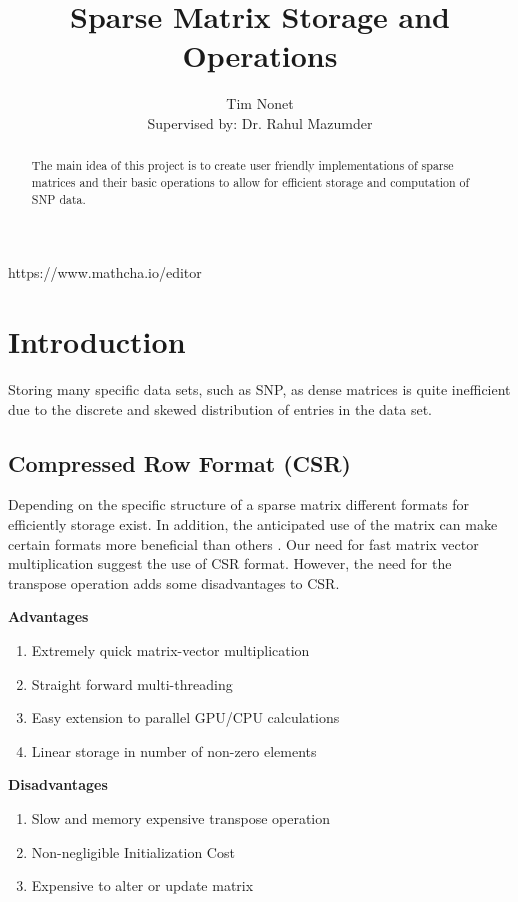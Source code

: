 \documentclass[12pt]{article}
\title{
{Sparse Matrix Storage and Operations}
}
\author{Tim Nonet \\ Supervised by: Dr. Rahul Mazumder}
\begin{document}
\maketitle
https://www.mathcha.io/editor
\begin{abstract}
The main idea of this project is to create user friendly implementations of sparse matrices and their basic operations to allow for efficient storage and computation of SNP data.

\end{abstract}
\section{Introduction}
Storing many specific data sets, such as SNP, as dense matrices is quite inefficient due to the discrete and skewed distribution of entries in the data set. 
\subsection{Compressed Row Format (CSR) }
Depending on the specific structure of a sparse matrix different formats for efficiently storage exist. In addition, the anticipated use of the matrix can make certain formats more beneficial than others \cite{sparskit}. Our need for fast matrix vector multiplication suggest the use of CSR format. However, the need for the transpose operation adds some disadvantages to CSR. \newline \newline

\noindent
\textbf{Advantages}
\begin{enumerate}
\item Extremely quick matrix-vector multiplication
\item Straight forward multi-threading 
\item Easy extension to parallel GPU/CPU calculations 
\item Linear storage in number of non-zero elements 
\end{enumerate}

\noindent
\textbf{Disadvantages} 
\begin{enumerate}
\item Slow and memory expensive transpose operation
\item Non-negligible Initialization Cost 
\item Expensive to alter or update matrix
\end{enumerate}
\end{document}
